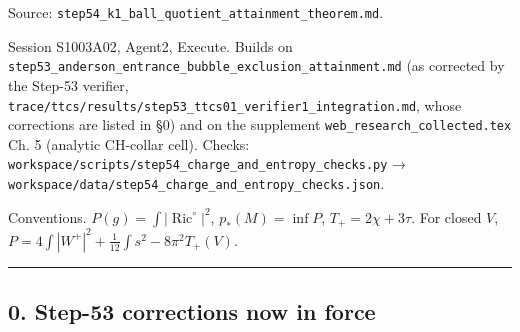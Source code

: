 \documentclass[
  10pt,
]{report}
\begin{document}
Source: \texttt{step54\_k1\_ball\_quotient\_attainment\_theorem.md}.

Session S1003A02, Agent2, Execute. Builds on
\texttt{step53\_anderson\_entrance\_bubble\_exclusion\_attainment.md}
(as corrected by the Step-53 verifier,
\texttt{trace/ttcs/results/step53\_ttcs01\_verifier1\_integration.md},
whose corrections are listed in §0) and on the supplement
\texttt{web\_research\_collected.tex} Ch. 5 (analytic CH-collar cell).
Checks:
\texttt{workspace/scripts/step54\_charge\_and\_entropy\_checks.py} →
\texttt{workspace/data/step54\_charge\_and\_entropy\_checks.json}.

Conventions. \(P(g)=\int|\operatorname{Ric}^\circ|^2\),
\(p_*(M)=\inf P\), \(T_+=2\chi+3\tau\). For closed \(V\),
\(P=4\int|W^+|^2+\frac1{12}\int s^2-8\pi^2T_+(V)\).

\begin{center}\rule{0.5\linewidth}{0.5pt}\end{center}

\hypertarget{step-53-corrections-now-in-force}{%
\subsection{0. Step-53 corrections now in
force}\label{step-53-corrections-now-in-force}}
\end{document}
